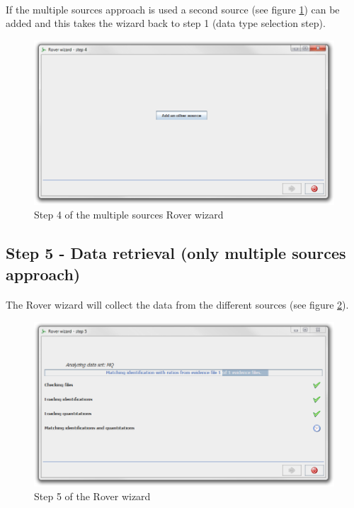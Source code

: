 \documentclass[11pt,a4paper,oneside,notitlepage]{book}
\begin{document}
\paragraph{}If the multiple sources approach is used a second source (see figure \ref{step4_M}) can be added and this takes the wizard back to step 1 (data type selection step).

\begin{figure}[H]
\begin{center}
\includegraphics[scale=0.4]{Rover_wizard_-_step_4_M.png}
\caption{Step 4 of the multiple sources Rover wizard}
\label{step4_M}
\end{center}
\end{figure} 

\subsection{Step 5 - Data retrieval (only multiple sources approach)}
\paragraph{}The Rover wizard will collect the data from the different sources (see figure \ref{step5}). 

\begin{figure}[H]
\begin{center}
\includegraphics[scale=0.4]{Rover_wizard_-_step_5_M.png}
\caption{Step 5 of the Rover wizard}
\label{step5}
\end{center}
\end{figure}
\end{document}
